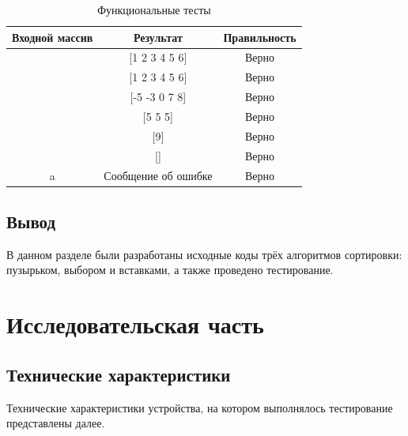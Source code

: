 \documentclass[a4paper,14pt, unknownkeysallowed]{extreport}
\begin{document}
\begin{table}[h]
	\begin{center}
		\begin{threeparttable}
		\captionsetup{justification=raggedleft,singlelinecheck=off}
		\caption{\label{tbl:functional_test} Функциональные тесты}
		\begin{tabular}{|c|c|c|}
			\hline
            Входной массив & Результат    		 & Правильность \\ 
			\hline
            [1 2 3 4 5 6]  & [1 2 3 4 5 6]		 & Верно        \\ 
			\hline
            [6 5 4 3 2 1]  & [1 2 3 4 5 6]		 & Верно        \\ 
			\hline
            [7 -3 8 -5 0]  & [-5 -3 0 7 8]		 & Верно        \\ 
			\hline
            [5 5 5]        & [5 5 5]       		 & Верно        \\ 
			\hline
            [9]            & [9]           		 & Верно        \\ 
			\hline
            []             & []            		 & Верно        \\ 
			\hline
			a              & Сообщение об ошибке & Верно        \\ 
			\hline
		\end{tabular}
    \end{threeparttable}
	\end{center}
\end{table}

\section{Вывод}

В данном разделе были разработаны исходные коды трёх алгоритмов сортировки: пузырьком, выбором и вставками, а также проведено тестирование.





\chapter{Исследовательская часть}

\section{Технические характеристики}

Технические характеристики устройства, на котором выполнялось тестирование представлены далее.
\end{document}
